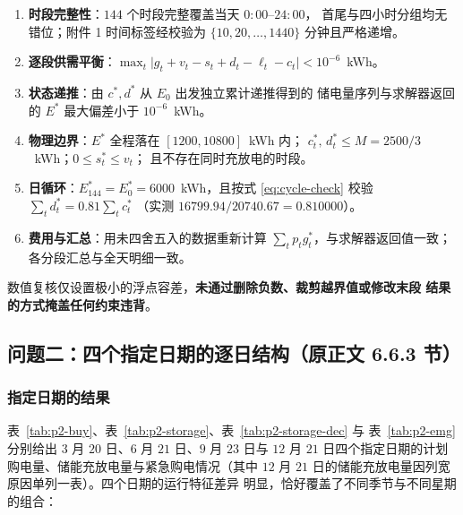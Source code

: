 \begin{enumerate}
  \item \textbf{时段完整性}：$144$ 个时段完整覆盖当天 $0{:}00$--$24{:}00$，
        首尾与四小时分组均无错位；附件 1 时间标签经校验为
        $\{10,20,\dots,1440\}$ 分钟且严格递增。
  \item \textbf{逐段供需平衡}：$\max_t\bigl|g_t+v_t-s_t+d_t-\ell_t-c_t\bigr|
        < 10^{-6}$~kWh。
  \item \textbf{状态递推}：由 $c^*,d^*$ 从 $E_0$ 出发独立累计递推得到的
        储电量序列与求解器返回的 $E^*$ 最大偏差小于 $10^{-6}$~kWh。
  \item \textbf{物理边界}：$E^*$ 全程落在 $[1200,10800]$~kWh 内；
        $c_t^*,\,d_t^* \le M = 2500/3$~kWh；$0 \le s_t^* \le v_t$；
        且不存在同时充放电的时段。
  \item \textbf{日循环}：$E_{144}^* = E_0^* = 6000$~kWh，且按式
        \eqref{eq:cycle-check} 校验 $\sum_t d_t^* = 0.81\sum_t c_t^*$
        （实测 $16799.94 / 20740.67 = 0.810000$）。
  \item \textbf{费用与汇总}：用未四舍五入的数据重新计算
        $\sum_t p_t g_t^*$，与求解器返回值一致；各分段汇总与全天明细一致。
\end{enumerate}

数值复核仅设置极小的浮点容差，\textbf{未通过删除负数、裁剪越界值或修改末段
结果的方式掩盖任何约束违背}。

\subsection{问题二：四个指定日期的逐日结构（原正文 6.6.3 节）}
\label{app:p2-dates}

\subsubsection{指定日期的结果}

表~\ref{tab:p2-buy}、表~\ref{tab:p2-storage}、表~\ref{tab:p2-storage-dec} 与
表~\ref{tab:p2-emg} 分别给出 $3$ 月 $20$ 日、$6$ 月 $21$ 日、$9$ 月 $23$ 日与
$12$ 月 $21$ 日四个指定日期的计划购电量、储能充放电量与紧急购电情况（其中
$12$ 月 $21$ 日的储能充放电量因列宽原因单列一表）。四个日期的运行特征差异
明显，恰好覆盖了不同季节与不同星期的组合：

